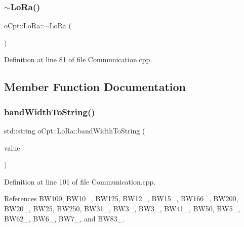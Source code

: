 \hypertarget{classo_cpt_1_1_lo_ra_a203df2d51c12d24731241f89bec20200}{}\label{classo_cpt_1_1_lo_ra_a203df2d51c12d24731241f89bec20200} 
\subsubsection{\texorpdfstring{$\sim$\+Lo\+Ra()}{~LoRa()}}
{\footnotesize\ttfamily o\+Cpt\+::\+Lo\+Ra\+::$\sim$\+Lo\+Ra (\begin{DoxyParamCaption}{ }\end{DoxyParamCaption})\hspace{0.3cm}{\ttfamily [virtual]}}



Definition at line 81 of file Communication.\+cpp.



\subsection{Member Function Documentation}
\hypertarget{classo_cpt_1_1_lo_ra_a225b527e6f098ae6b481ed56edb0744c}{}\label{classo_cpt_1_1_lo_ra_a225b527e6f098ae6b481ed56edb0744c} 
\subsubsection{\texorpdfstring{band\+Width\+To\+String()}{bandWidthToString()}}
{\footnotesize\ttfamily std\+::string o\+Cpt\+::\+Lo\+Ra\+::band\+Width\+To\+String (\begin{DoxyParamCaption}\item[{const \hyperlink{classo_cpt_1_1_lo_ra_abb27d22a584625eea0339906152c031d}{Band\+Width} \&}]{value }\end{DoxyParamCaption})\hspace{0.3cm}{\ttfamily [protected]}}



Definition at line 101 of file Communication.\+cpp.



References B\+W100, B\+W10\+\_, B\+W125, B\+W12\+\_, B\+W15\+\_, B\+W166\+\_, B\+W200, B\+W20\+\_, B\+W25, B\+W250, B\+W31\+\_, B\+W3\+\_, B\+W3\+\_, B\+W41\+\_, B\+W50, B\+W5\+\_, B\+W62\+\_, B\+W6\+\_, B\+W7\+\_, and B\+W83\+\_.

